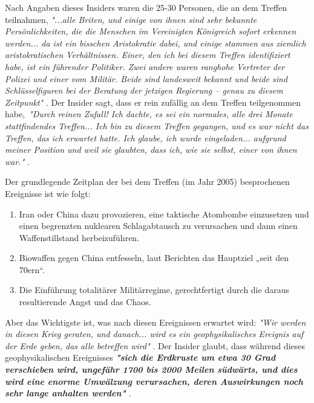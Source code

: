 \documentclass[10pt,twocolumn,letterpaper]{article}
\begin{document}
Nach Angaben dieses Insiders waren die 25-30 Personen, die an dem Treffen teilnahmen, \textit{"...alle Briten, und einige von ihnen sind sehr bekannte Persönlichkeiten, die die Menschen im Vereinigten Königreich sofort erkennen werden... da ist ein bisschen Aristokratie dabei, und einige stammen aus ziemlich aristokratischen Verhältnissen. Einer, den ich bei diesem Treffen identifiziert habe, ist ein führender Politiker. Zwei andere waren ranghohe Vertreter der Polizei und einer vom Militär. Beide sind landesweit bekannt und beide sind Schlüsselfiguren bei der Beratung der jetzigen Regierung – genau zu diesem Zeitpunkt"} \cite{4}. Der Insider sagt, dass er rein zufällig an dem Treffen teilgenommen habe,\ \textit{"Durch reinen Zufall! Ich dachte, es sei ein normales, alle drei Monate stattfindendes Treffen... Ich bin zu diesem Treffen gegangen, und es war nicht das Treffen, das ich erwartet hatte. Ich glaube, ich wurde eingeladen... aufgrund meiner Position und weil sie glaubten, dass ich, wie sie selbst, einer von ihnen war."} \cite{4}.

Der grundlegende Zeitplan der bei dem Treffen (im Jahr 2005) besprochenen Ereignisse ist wie folgt:
\begin{flushleft}
\begin{enumerate}
    \item Iran oder China dazu provozieren, eine taktische Atombombe einzusetzen und einen begrenzten nuklearen Schlagabtausch zu verursachen und dann einen Waffenstillstand herbeizuführen.
    \item Biowaffen gegen China entfesseln, laut Berichten das Hauptziel „seit den 70ern“.
    \item Die Einführung totalitärer Militärregime, gerechtfertigt durch die daraus resultierende Angst und das Chaos.
\end{enumerate}
\end{flushleft}

Aber das Wichtigste ist, was nach diesen Ereignissen erwartet wird: \textit{"Wir werden in diesen Krieg geraten, und danach... wird es ein geophysikalisches Ereignis auf der Erde geben, das alle betreffen wird"} \cite{4}. Der Insider glaubt, dass während dieses geophysikalischen Ereignisses \textit{\textbf{"sich die Erdkruste um etwa 30 Grad verschieben wird, ungefähr 1700 bis 2000 Meilen südwärts, und dies wird eine enorme Umwälzung verursachen, deren Auswirkungen noch sehr lange anhalten werden"}} \cite{4}.
\end{document}
